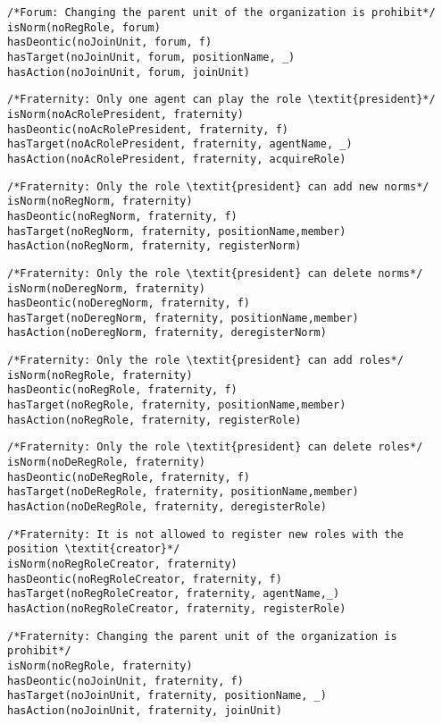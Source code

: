 \begin{verbatim}
/*Forum: Changing the parent unit of the organization is prohibit*/
isNorm(noRegRole, forum)
hasDeontic(noJoinUnit, forum, f)
hasTarget(noJoinUnit, forum, positionName, _)
hasAction(noJoinUnit, forum, joinUnit)
\end{verbatim}

\begin{verbatim}
/*Fraternity: Only one agent can play the role \textit{president}*/
isNorm(noAcRolePresident, fraternity)
hasDeontic(noAcRolePresident, fraternity, f)
hasTarget(noAcRolePresident, fraternity, agentName, _)
hasAction(noAcRolePresident, fraternity, acquireRole)
\end{verbatim}

\begin{verbatim}
/*Fraternity: Only the role \textit{president} can add new norms*/
isNorm(noRegNorm, fraternity)
hasDeontic(noRegNorm, fraternity, f)
hasTarget(noRegNorm, fraternity, positionName,member)
hasAction(noRegNorm, fraternity, registerNorm)
\end{verbatim}

\begin{verbatim}
/*Fraternity: Only the role \textit{president} can delete norms*/
isNorm(noDeregNorm, fraternity)
hasDeontic(noDeregNorm, fraternity, f)
hasTarget(noDeregNorm, fraternity, positionName,member)
hasAction(noDeregNorm, fraternity, deregisterNorm)
\end{verbatim}

\begin{verbatim}
/*Fraternity: Only the role \textit{president} can add roles*/
isNorm(noRegRole, fraternity)
hasDeontic(noRegRole, fraternity, f)
hasTarget(noRegRole, fraternity, positionName,member)
hasAction(noRegRole, fraternity, registerRole)
\end{verbatim}

\begin{verbatim}
/*Fraternity: Only the role \textit{president} can delete roles*/
isNorm(noDeRegRole, fraternity)
hasDeontic(noDeRegRole, fraternity, f)
hasTarget(noDeRegRole, fraternity, positionName,member)
hasAction(noDeRegRole, fraternity, deregisterRole)
\end{verbatim}


\begin{verbatim}
/*Fraternity: It is not allowed to register new roles with the position \textit{creator}*/
isNorm(noRegRoleCreator, fraternity)
hasDeontic(noRegRoleCreator, fraternity, f)
hasTarget(noRegRoleCreator, fraternity, agentName,_)
hasAction(noRegRoleCreator, fraternity, registerRole)
\end{verbatim}

\begin{verbatim}
/*Fraternity: Changing the parent unit of the organization is prohibit*/
isNorm(noRegRole, fraternity)
hasDeontic(noJoinUnit, fraternity, f)
hasTarget(noJoinUnit, fraternity, positionName, _)
hasAction(noJoinUnit, fraternity, joinUnit)
\end{verbatim}

